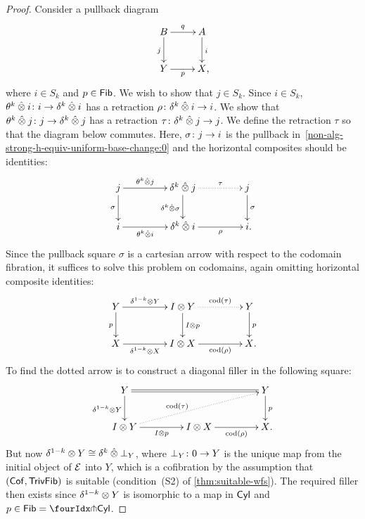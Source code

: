 \documentclass[reqno,10pt,a4paper,oneside,draft]{amsart}
\begin{document}
{{\begin{proof}
Consider a pullback diagram
\begin{equation} \label{non-alg-strong-h-equiv-uniform-base-change:0}
\begin{gathered}
\xymatrix{
 B \ar[d]_j \ar[r]^q & A \ar[d]^i \\
Y \ar[r]_p & X \rlap{,}}
\end{gathered}
\end{equation}
where $i  \in S_k$ and $p \in \mathsf{Fib}$.
We wish to show that $j \in  S_k$.
Since $i \in S_k$, $\theta^k \mathbin{\hat{\otimes}} i \colon i \to \delta^k \mathbin{\hat{\otimes}} i$ has a retraction $\rho \colon \delta^k \mathbin{\hat{\otimes}} i \to i$.
We show that $\theta^k \mathbin{\hat{\otimes}} j \colon j \to \delta^k \mathbin{\hat{\otimes}} j$ has a retraction $\tau \colon  \delta^k \mathbin{\hat{\otimes}} j \to j$.
We define the retraction $\tau$ so that the diagram below commutes.
Here, $\sigma \colon j \to i$ is the pullback in~\eqref{non-alg-strong-h-equiv-uniform-base-change:0} and the horizontal composites should be identities:
\[
\xymatrix@C+2em{
j
  \ar[r]^-{\thetak \hatotimes j}
  \ar[d]_{\sigma}
&
  \kcyl \hatotimes j
  \ar@{.>}[r]^-{\tau}
  \ar[d]_{\kcyl \hatotimes \sigma}
&
 j
  \ar[d]^{\sigma}
\\
  i
  \ar[r]_-{\thetak \hatotimes i}
&
  \kcyl \hatotimes i
  \ar[r]_-{\rho}
&
  i
\rlap{.}}
\]
Since the pullback square $\sigma$ is a cartesian arrow with respect to the codomain fibration, it suffices to solve this problem on codomains, again omitting horizontal composite identities:
\[
\xymatrix@C+2em{
  Y
  \ar[r]^-{\kcylinv \otimes Y}
  \ar[d]_{p}
&
  \interval \otimes Y
  \ar@{.>}[r]^-{\cod(\tau)}
  \ar[d]^{\interval \otimes p}
&
  Y
  \ar[d]^{p}
\\
  X
  \ar[r]_-{\kcylinv \otimes X}
&
  \interval \otimes X
  \ar[r]_-{\cod(\rho)}
&
  X
\rlap{.}}
\]
To find the dotted arrow is to construct a diagonal filler in the following square:
\[
\xymatrix@C+2em{
  Y
  \ar@{=}[rr]
  \ar[d]_{\kcylinv \otimes Y}
&&
  Y
  \ar[d]^{p}
\\
  \interval \otimes Y
  \ar[r]_-{I \otimes p}
  \ar@{.>}[urr]^(0.4){\cod(\tau)}
&
  \interval \otimes X
  \ar[r]_-{\cod(\rho)}
&
  X
\rlap{.}}
\]
But now $\delta^{1-k} \otimes Y \cong \delta^k \mathbin{\hat{\otimes}} \bot_Y$, where $\bot_Y \colon 0 \to Y$ is the unique map from the initial object of $\mathcal{E}$ into $Y$, which is a cofibration by the assumption that $(\mathsf{Cof}, \mathsf{TrivFib})$ is suitable (condition~(S2) of \cref{thm:suitable-wfs}).
The required filler then exists since $\delta^{1-k} \otimes Y$ is isomorphic to a map in $\mathsf{Cyl}$ and~$p \in \Fib = \liftr{\Cyl}$.
\end{proof}

}}
\end{document}
